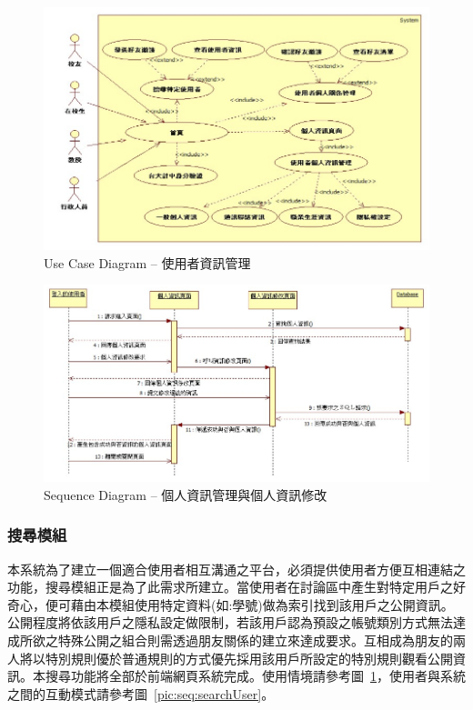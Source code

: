 \begin{figure}[h]
\centering
\includegraphics[width=\textwidth]{img/use01.png}
\caption{Use Case Diagram -- 使用者資訊管理}
\label{pic:use:userLogin}
\end{figure}

\begin{figure}[h]
\centering
\includegraphics[width=\textwidth]{img/seq02.png}
\caption{Sequence Diagram -- 個人資訊管理與個人資訊修改}
\label{pic:seq:profileMgt}
\end{figure}

\subsubsection{搜尋模組}
本系統為了建立一個適合使用者相互溝通之平台，必須提供使用者方便互相連結之功能，搜尋模組正是為了此需求所建立。當使用者在討論區中產生對特定用戶之好奇心，便可藉由本模組使用特定資料(如:學號)做為索引找到該用戶之公開資訊。公開程度將依該用戶之隱私設定做限制，若該用戶認為預設之帳號類別方式無法達成所欲之特殊公開之組合則需透過朋友關係的建立來達成要求。互相成為朋友的兩人將以特別規則優於普通規則的方式優先採用該用戶所設定的特別規則觀看公開資訊。本搜尋功能將全部於前端網頁系統完成。使用情境請參考圖~\ref{pic:use:userLogin}，使用者與系統之間的互動模式請參考圖~\ref{pic:seq:searchUser}。

